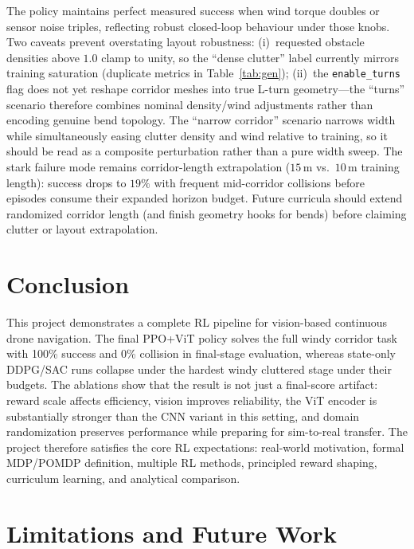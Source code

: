 \documentclass[twocolumn,a4paper,10pt]{article}
\begin{document}
The policy maintains perfect measured success when wind torque doubles or sensor noise triples,
reflecting robust closed-loop behaviour under those knobs.
Two caveats prevent overstating layout robustness: (i)~requested obstacle densities above \(1.0\) clamp to unity,
so the ``dense clutter'' label currently mirrors training saturation (duplicate metrics in Table~\ref{tab:gen}); (ii)~the \texttt{enable\_turns} flag does not yet reshape corridor meshes into true L-turn geometry---the ``turns'' scenario therefore combines nominal density/wind adjustments rather than encoding genuine bend topology.
The ``narrow corridor'' scenario narrows width while simultaneously easing clutter density and wind relative to training, so it should be read as a composite perturbation rather than a pure width sweep.
The stark failure mode remains corridor-length extrapolation (\(15\,\mathrm{m}\) vs.\ \(10\,\mathrm{m}\) training length): success drops to \(19\%\) with frequent mid-corridor collisions before episodes consume their expanded horizon budget.
Future curricula should extend randomized corridor length (and finish geometry hooks for bends) before claiming clutter or layout extrapolation.

\section{Conclusion}

This project demonstrates a complete RL pipeline for vision-based continuous
drone navigation.  The final PPO+ViT policy solves the full windy corridor
task with 100\% success and 0\% collision in final-stage evaluation, whereas
state-only DDPG/SAC runs collapse under the hardest windy cluttered stage under their budgets.
The ablations show that the result is not just a final-score artifact: reward scale affects efficiency,
vision improves reliability, the ViT encoder is substantially stronger than
the CNN variant in this setting, and domain randomization preserves
performance while preparing for sim-to-real transfer.  The project therefore
satisfies the core RL expectations: real-world motivation, formal
MDP/POMDP definition, multiple RL methods, principled reward shaping,
curriculum learning, and analytical comparison.

\section{Limitations and Future Work}
\end{document}
